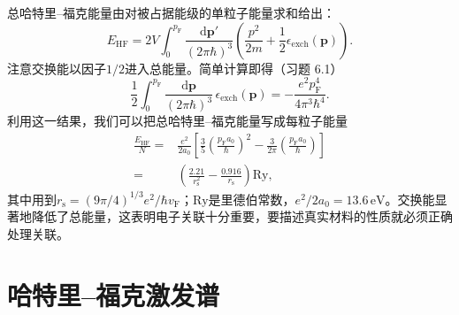 总哈特里–福克能量由对被占据能级的单粒子能量求和给出：
\begin{equation*}
E_{\mathrm{HF}} = 2V\int_0^{p_{\mathrm{F}}} \frac{\mathrm{d}\mathbf{p}'}{(2\pi\hbar)^3}\left(\frac{p^2}{2m} + \frac{1}{2}\epsilon_{\mathrm{exch}}(\mathbf{p})\right).
\tag{6.13}
\end{equation*}
注意交换能以因子$1/2$进入总能量。简单计算即得（习题 6.1）
\begin{equation*}
\frac{1}{2}\int_0^{p_{\mathrm{F}}} \frac{\mathrm{d}\mathbf{p}}{(2\pi\hbar)^3}\,\epsilon_{\mathrm{exch}}(\mathbf{p}) = -\frac{e^2 p_{\mathrm{F}}^4}{4\pi^3\hbar^4}.
\tag{6.14}
\end{equation*}
利用这一结果，我们可以把总哈特里–福克能量写成每粒子能量
\begin{equation*}
\begin{aligned}
\frac{E_{\mathrm{HF}}}{N} ={}& \frac{e^2}{2a_0}\left[\frac{3}{5}\left(\frac{p_{\mathrm{F}}a_0}{\hbar}\right)^2 - \frac{3}{2\pi}\left(\frac{p_{\mathrm{F}}a_0}{\hbar}\right)\right] \\
={}& \left(\frac{2.21}{r_{\mathrm{s}}^2} - \frac{0.916}{r_{\mathrm{s}}}\right)\mathrm{Ry},
\end{aligned}
\tag{6.15}
\end{equation*}
其中用到$r_{\mathrm{s}} = (9\pi/4)^{1/3}e^2/\hbar v_{\mathrm{F}}$；$\mathrm{Ry}$是里德伯常数，$e^2/2a_0 = 13.6\,\mathrm{eV}$。交换能显著地降低了总能量，这表明电子关联十分重要，要描述真实材料的性质就必须正确处理关联。

\section{哈特里–福克激发谱}

